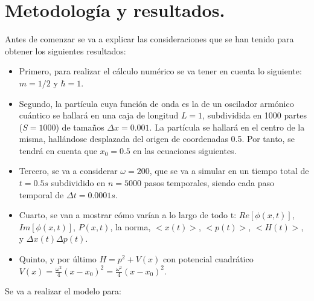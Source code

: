 \documentclass[12pt,paper]{article}
\begin{document}
\section{Metodología y resultados.}
Antes de comenzar se va a explicar las consideraciones que se han tenido para obtener los siguientes resultados:
\begin{itemize}
    \item Primero, para realizar el cálculo numérico se va tener en cuenta lo siguiente: $m = 1/2$ y $\hbar = 1$.
    \item Segundo, la partícula cuya función de onda es la de un oscilador armónico cuántico se hallará en una caja de longitud $L=1$, subdividida en 1000 partes ($S=1000$) de tamaños $\Delta x = 0.001$. La partícula se hallará en el centro de la misma, hallándose desplazada del origen de coordenadas 0.5. Por tanto, se tendrá en cuenta que $x_0 = 0.5$ en las ecuaciones siguientes.
    \item Tercero, se va a considerar $\omega = 200$, que se va a simular en un tiempo total de $t = 0.5s$ subdividido en $n=5000$ pasos temporales, siendo cada paso temporal de $\Delta t = 0.0001 s$.
    \item Cuarto, se van a mostrar cómo varían a lo largo de todo t: $Re[\phi(x,t)]$, $Im[\phi(x,t)]$, $P(x,t)$, la norma, $<x(t)>$, $<p(t)>$, $<H(t)>$, y $\Delta x(t) \Delta p(t)$.
    \item Quinto, y por último $H = p^2 + V(x)$ con potencial cuadrático $V(x) = \frac{\omega^2}{4}(x-x_0)^2 = \frac{\omega^2}{4}(x-x_0)^2$.
\end{itemize}
Se va a realizar el modelo para:
\end{document}
